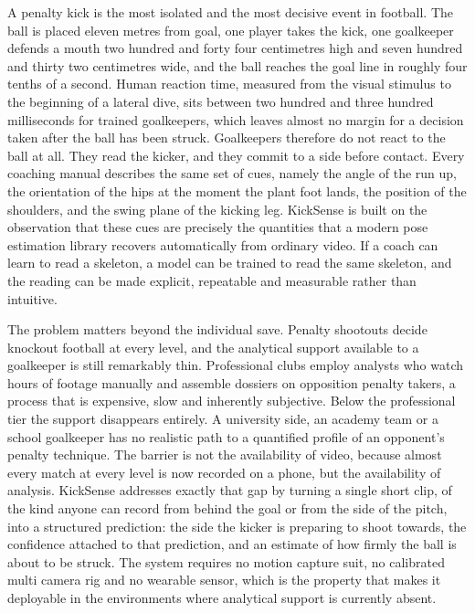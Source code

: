 A penalty kick is the most isolated and the most decisive event in football. The ball is placed eleven metres from goal, one player takes the kick, one goalkeeper defends a mouth two hundred and forty four centimetres high and seven hundred and thirty two centimetres wide, and the ball reaches the goal line in roughly four tenths of a second. Human reaction time, measured from the visual stimulus to the beginning of a lateral dive, sits between two hundred and three hundred milliseconds for trained goalkeepers, which leaves almost no margin for a decision taken after the ball has been struck. Goalkeepers therefore do not react to the ball at all. They read the kicker, and they commit to a side before contact. Every coaching manual describes the same set of cues, namely the angle of the run up, the orientation of the hips at the moment the plant foot lands, the position of the shoulders, and the swing plane of the kicking leg. KickSense is built on the observation that these cues are precisely the quantities that a modern pose estimation library recovers automatically from ordinary video. If a coach can learn to read a skeleton, a model can be trained to read the same skeleton, and the reading can be made explicit, repeatable and measurable rather than intuitive.

The problem matters beyond the individual save. Penalty shootouts decide knockout football at every level, and the analytical support available to a goalkeeper is still remarkably thin. Professional clubs employ analysts who watch hours of footage manually and assemble dossiers on opposition penalty takers, a process that is expensive, slow and inherently subjective. Below the professional tier the support disappears entirely. A university side, an academy team or a school goalkeeper has no realistic path to a quantified profile of an opponent's penalty technique. The barrier is not the availability of video, because almost every match at every level is now recorded on a phone, but the availability of analysis. KickSense addresses exactly that gap by turning a single short clip, of the kind anyone can record from behind the goal or from the side of the pitch, into a structured prediction: the side the kicker is preparing to shoot towards, the confidence attached to that prediction, and an estimate of how firmly the ball is about to be struck. The system requires no motion capture suit, no calibrated multi camera rig and no wearable sensor, which is the property that makes it deployable in the environments where analytical support is currently absent.

